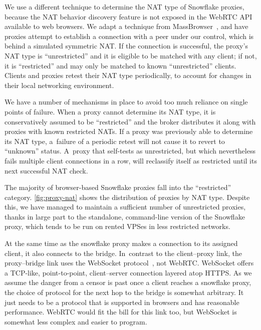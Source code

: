\documentclass[letterpaper,twocolumn]{article}
\begin{document}
We use a different technique to determine the NAT type of Snowflake proxies,
because the NAT behavior discovery feature
is not exposed in the WebRTC API available to web browsers.
We adapt a technique from MassBrowser~\cite[\S \mbox{V-A}]{Nasr2020a},
and have proxies attempt to establish a connection with a peer under our control,
which is behind a simulated symmetric NAT.
If the connection is successful,
the proxy's NAT type is ``unrestricted''
and it is eligible to be matched with any client;
if not, it is ``restricted''
and may only be matched to known ``unrestricted'' clients.
Clients and proxies
retest their NAT type periodically, to account for changes in their local networking
environment.

We have a number of
mechanisms in place to avoid too much reliance on single points of failure.
When a proxy cannot determine its NAT type,
it is conservatively assumed to be ``restricted'' and the broker distributes it
along with proxies with known restricted NATs.
If a proxy was previously able to determine its NAT type,
a~failure of a periodic retest will not cause it to revert to ``unknown'' status.
A~proxy that self-tests as unrestricted,
but which nevertheless fails multiple client connections in a row,
will reclassify itself as restricted
until its next successful NAT check.

The majority of browser-based Snowflake proxies
fall into the ``restricted'' category.
\autoref{fig:proxy-nat} shows the distribution of proxies by NAT type.
Despite this, we have managed to maintain a sufficient number of unrestricted proxies,
thanks in large part to the standalone, command-line
version of the Snowflake proxy,
which tends to be run on rented VPSes in less restricted networks.

At the same time as the snowflake proxy makes a connection to its assigned client,
it also connects to the bridge.
In~contrast to the client--proxy link,
the proxy--bridge link
uses the WebSocket protocol~\cite{rfc6455}, not WebRTC.
WebSocket offers a TCP-like, point-to-point, client--server connection
layered atop HTTPS.
As we assume the danger from a censor is past
once a client reaches a snowflake proxy,
the choice of protocol for the next hop to the bridge is somewhat arbitrary.
It just needs to be a protocol that is supported in browsers
and has reasonable performance.
WebRTC would fit the bill for this link too,
but WebSocket is somewhat less complex and easier to program.
\end{document}
